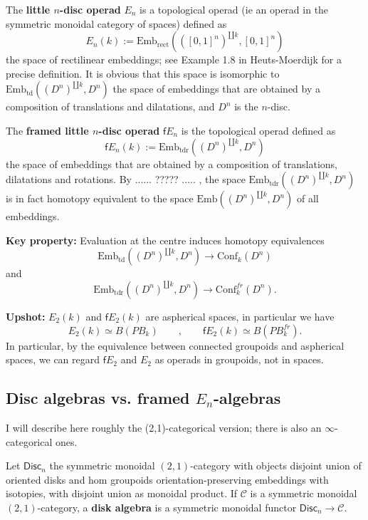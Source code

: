 \documentclass[11pt]{article}
\newcommand{\C}{\mathcal{C}}
\theoremstyle{definition}
\begin{document}
The \textbf{little $n$-disc operad} $E_n$ is a topological operad (ie an operad in the symmetric monoidal category of spaces) defined as $$ E_n(k) := \text{Emb}_{\text{rect}} (([0,1]^n)^{\amalg k}, [0,1]^n) $$ the space of rectilinear embeddings; see Example 1.8 in Heuts-Moerdijk for a precise definition. It is obvious that this space is isomorphic to $\text{Emb}_{\text{td}} ((D^n)^{\amalg k}, D^n)$ the space of embeddings that are obtained by a composition of translations and dilatations, and $D^n$ is the $n$-disc.

The \textbf{framed little $n$-disc operad} $\textsf{f}E_n$ is the topological operad defined as 
$$\textsf{f}E_n(k):= \text{Emb}_{\text{tdr}} ((D^n)^{\amalg k}, D^n)$$   the space of embeddings that are obtained by a composition of translations, dilatations and rotations. By ...... ????? ..... , the space $\text{Emb}_{\text{tdr}} ((D^n)^{\amalg k}, D^n)$ is in fact homotopy equivalent to the space $\text{Emb} ((D^n)^{\amalg k}, D^n)$ of all embeddings.\medskip

 \noindent \textbf{Key property:} Evaluation at the centre induces homotopy equivalences
$$  \text{Emb}_{\text{td}} ((D^n)^{\amalg k}, D^n) \to  \text{Conf}_k(D^n) $$ and 
$$  \text{Emb}_{\text{tdr}} ((D^n)^{\amalg k}, D^n) \to  \text{Conf}^{fr}_k(D^n) .$$

 \noindent \textbf{Upshot:}  $E_2(k)$ and $\textsf{f}E_2(k)$ are aspherical spaces, in particular we have $$ E_2(k) \simeq B(PB_k) \qquad , \qquad   \textsf{f}E_2(k) \simeq B(PB_k^{fr}). $$
In particular, by the equivalence between connected groupoids and aspherical spaces, we can regard $\textsf{f}E_2$ and $E_2$ as operads in groupoids, not in spaces.
 




\subsection{Disc algebras vs. framed $E_n$-algebras} 


I will describe here roughly the (2,1)-categorical version; there is also an $\infty$-categorical ones.


Let $\mathsf{Disc}_n$  the symmetric monoidal $(2,1)$-category with objects disjoint union of oriented disks and hom groupoids orientation-preserving embeddings with isotopies, with disjoint union as monoidal product. If $\C$ is a symmetric monoidal $(2,1)$-category, a \textbf{disk algebra }is a symmetric monoidal functor $\mathsf{Disc}_n \to \C$.
\end{document}
